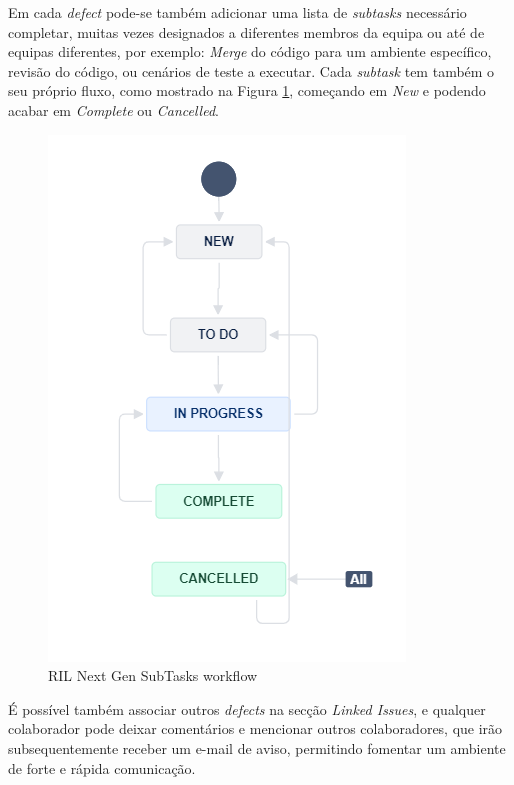             Em cada \textit{defect} pode-se também adicionar uma lista de \textit{subtasks} necessário completar, muitas vezes designados a diferentes membros da equipa ou até de equipas diferentes, por exemplo: \textit{Merge} do código para um ambiente específico, revisão do código, ou cenários de teste a executar. Cada \textit{subtask} tem também o seu próprio fluxo, como mostrado na Figura \ref{fig:ril-nextgen-subtasks-workflow}, começando em \textit{New} e podendo acabar em \textit{Complete} ou \textit{Cancelled}.

            \begin{figure}[htbp]
                \centering
                \includegraphics[scale=1.6]{imgs/NextGenSubTaskWorkflow.png}
                \caption{RIL Next Gen SubTasks workflow}\label{fig:ril-nextgen-subtasks-workflow}
            \end{figure}

            É possível também associar outros \textit{defects} na secção \textit{Linked Issues}, e qualquer colaborador pode deixar comentários e mencionar outros colaboradores, que irão subsequentemente receber um e-mail de aviso, permitindo fomentar um ambiente de forte e rápida comunicação.

